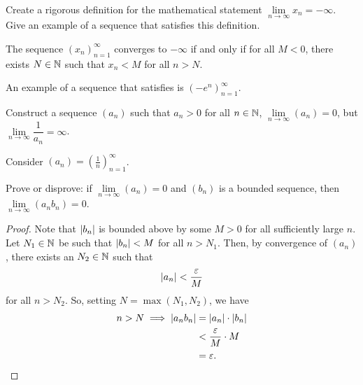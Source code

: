 \begin{problem}
  Create a rigorous definition for the mathematical statement 
  $\lim\limits_{n \to \infty} x_{n} = -\infty$. Give an example of a 
  sequence that satisfies this definition. 

    \begin{definition}
      \label{def:convergence-to-neg-infty}
      The sequence $(x_{n})_{n=1}^{\infty}$ converges to $-\infty$ if and only if
      for all $M < 0$, there exists $N \in \mathbb{N}$ such that $x_{n} < M$ 
      for all $n > N$.
    \end{definition}

    An example of a sequence that satisfies  is
    $(-e^{n})_{n=1}^{\infty}$.
\end{problem}

\begin{problem}
  Construct a sequence $(a_{n})$ such that $a_{n} > 0$ for all $n \in \mathbb{N}$,
  $\lim\limits_{n \to \infty} (a_{n}) = 0$, but
  $\lim\limits_{n \to \infty} \dfrac{1}{a_{n}} = \infty$.

  \vspace{\baselineskip}

    Consider $(a_{n}) = \left( \frac{1}{n} \right)_{n=1}^{\infty}$.

\end{problem}

\begin{problem}
  Prove or disprove: if $\lim\limits_{n \to \infty} (a_{n}) = 0$ and $(b_{n})$ is
  a bounded sequence, then $\lim\limits_{n \to \infty} (a_{n}b_{n}) = 0$.

  \begin{proof} 
    Note that $\left\lvert b_{n} \right\rvert$ is bounded above by some $M > 0$ for all sufficiently large $n$.
    Let $N_{1} \in \mathbb{N}$ be such that $\left\lvert b_{n} \right\rvert < M$ for all $n > N_{1}$. Then, by convergence
    of $(a_{n})$, there exists an $N_{2} \in \mathbb{N}$ such that 
    \[
      \left\lvert a_{n} \right\rvert < \frac{\varepsilon}{M}
    \]
    for all $n > N_{2}$. So, setting $N = \max{(N_{1}, N_{2})}$, we have
    \begin{align*}
      n > N \implies \left\lvert a_{n}b_{n} \right\rvert &= \left\lvert a_{n} \right\rvert \cdot \left\lvert b_{n} \right\rvert \\
                                      &< \frac{\varepsilon}{M} \cdot M \\
                                      &= \varepsilon.
    \end{align*}
  \end{proof}

\end{problem}

